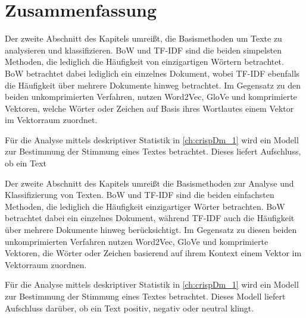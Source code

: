 \section{Zusammenfassung}


Der zweite Abschnitt des Kapitels umreißt, die Basismethoden um Texte zu analysieren und klassifizieren. \ac{BoW} und \ac{TF-IDF} sind die beiden simpelsten Methoden, die lediglich die Häufigkeit von einzigartigen Wörtern betrachtet. \ac{BoW} betrachtet dabei lediglich ein einzelnes Dokument, wobei \ac{TF-IDF} ebenfalls die Häufigkeit über mehrere Dokumente hinweg betrachtet. Im Gegensatz zu den beiden unkomprimierten Verfahren, nutzen Word2Vec, GloVe und \ft komprimierte Vektoren, welche Wörter oder Zeichen auf Basis ihres Wortlautes einem Vektor im Vektorraum zuordnet.

Für die Analyse mittels deskriptiver Statistik in \autoref{ch:crispDm_1} wird ein Modell zur Bestimmung der Stimmung eines Textes betrachtet. Dieses liefert Aufschluss, ob ein Text 

Der zweite Abschnitt des Kapitels umreißt die Basismethoden zur Analyse und Klassifizierung von Texten. \ac{BoW} und \ac{TF-IDF} sind die beiden einfachsten Methoden, die lediglich die Häufigkeit einzigartiger Wörter betrachten. \ac{BoW} betrachtet dabei ein einzelnes Dokument, während \ac{TF-IDF} auch die Häufigkeit über mehrere Dokumente hinweg berücksichtigt. Im Gegensatz zu diesen beiden unkomprimierten Verfahren nutzen Word2Vec, GloVe und \ft komprimierte Vektoren, die Wörter oder Zeichen basierend auf ihrem Kontext einem Vektor im Vektorraum zuordnen.

Für die Analyse mittels deskriptiver Statistik in \autoref{ch:crispDm_1} wird ein Modell zur Bestimmung der Stimmung eines Textes betrachtet. Dieses Modell liefert Aufschluss darüber, ob ein Text positiv, negativ oder neutral klingt.
